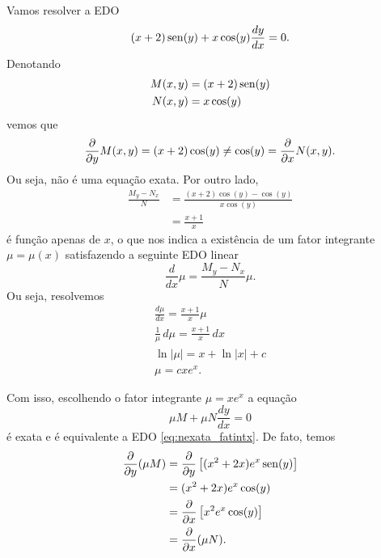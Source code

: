 \begin{ex}\label{ex:edo1ordem_exata_fix}
  Vamos resolver a EDO
  \begin{equation}\label{eq:nexata_fatintx}
    (x+2)\operatorname{sen}(y) + x\cos(y)\frac{dy}{dx} = 0.
  \end{equation}
  Denotando
  \begin{align}
    M(x,y) &= (x+2)\operatorname{sen}(y) \\
    N(x,y) &= x\cos(y)
  \end{align}
  vemos que
  \begin{equation}
    \frac{\partial}{\partial y}M(x,y) = (x+2)\cos(y) \neq \cos(y) = \frac{\partial}{\partial x}N(x,y).
  \end{equation}
  Ou seja, não é uma equação exata. Por outro lado,
  \begin{align}
    \frac{M_y-N_x}{N} &= \frac{(x+2)\cos(y) - \cos(y)}{x\cos(y)} \\
                      &= \frac{x+1}{x}
  \end{align}
  é função apenas de $x$, o que nos indica a existência de um fator integrante $\mu = \mu(x)$ satisfazendo a seguinte EDO linear
  \begin{equation}
    \frac{d}{dx}\mu = \frac{M_y-N_x}{N}\mu. 
  \end{equation}
  Ou seja, resolvemos
  \begin{gather}
    \frac{d\mu}{dx} = \frac{x+1}{x}\mu \\
    \frac{1}{\mu}\,d\mu = \frac{x+1}{x}\,dx \\
    \ln|\mu| = x + \ln|x| + c \\
    \mu = cxe^x.
  \end{gather}

  Com isso, escolhendo o fator integrante $\mu = xe^x$ a equação
  \begin{equation}\label{eq:nexata_fatintx_aux}
    \mu M + \mu N\frac{dy}{dx} = 0
  \end{equation}
  é exata e é equivalente a EDO \eqref{eq:nexata_fatintx}. De fato, temos
  \begin{align}
    \frac{\partial}{\partial y}(\mu M) &= \frac{\partial}{\partial y}\left[(x^2+2x)e^x\operatorname{sen}(y)\right] \\
                           &= (x^2+2x)e^x\cos(y) \\
                           &= \frac{\partial}{\partial x} \left[x^2e^x\cos(y)\right] \\
                           &= \frac{\partial}{\partial x}(\mu N).
  \end{align}


\end{ex}
